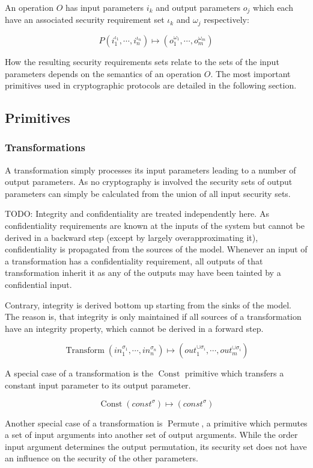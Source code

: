 \documentclass[a4paper]{article}
\DeclareMathOperator{\trans}{Transform}
\DeclareMathOperator{\const}{Const}
\DeclareMathOperator{\permute}{Permute}
\newcommand{\TODO}[1]{\small\noindent\color{red} TODO: #1\color{black}}
\begin{document}
An operation $O$ has input parameters $i_k$ and output parameters $o_j$ which
each have an associated security requirement set $\iota_k$ and $\omega_j$
respectively:

$$P(i_1^{\iota_1}, \cdots, i_n^{\iota_n}) \mapsto (o_1^{\omega_1}, \cdots, o_m^{\omega_m})$$

How the resulting security requirements sets relate to the sets of the input
parameters depends on the semantics of an operation $O$. The most important
primitives used in cryptographic protocols are detailed in the following
section.

\subsection{Primitives}

\subsubsection{Transformations}

A transformation simply processes its input parameters leading to a number of
output parameters. As no cryptography is involved the security sets of output
parameters can simply be calculated from the union of all input security sets.

\TODO{Integrity and confidentiality are treated independently here. As
confidentiality requirements are known at the inputs of the system but cannot
be derived in a backward step (except by largely overapproximating it),
confidentiality is propagated from the sources of the model. Whenever an input
of a transformation has a confidentiality requirement, all outputs of that
transformation inherit it as any of the outputs may have been tainted by a
confidential input.

Contrary, integrity is derived bottom up starting from the sinks of the model.
The reason is, that integrity is only maintained if all sources of a
transformation have an integrity property, which cannot be derived in a forward
step.}

$$\trans(in_1^{\sigma_1}, \cdots, in_n^{\sigma_n}) \mapsto (out_1^{\cup\sigma_i},\cdots,out_m^{\cup\sigma_i})$$

A special case of a transformation is the $\const$ primitive which transfers a
constant input parameter to its output parameter.

$$\const(const^{\sigma}) \mapsto (const^{\sigma})$$

Another special case of a transformation is $\permute$, a primitive which
permutes a set of input arguments into another set of output arguments. While
the order input argument determines the output permutation, its security set
does not have an influence on the security of the other parameters.
\end{document}
